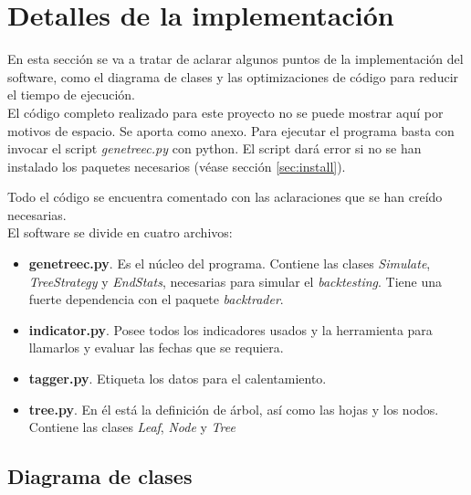 \section{Detalles de la implementaci\'on}

En esta secci\'on se va a tratar de aclarar algunos puntos de la implementaci\'on del software, como el diagrama de clases y las optimizaciones de c\'odigo para reducir el tiempo de ejecuci\'on.\\

El c\'odigo completo realizado para este proyecto no se puede mostrar aqu\'i por motivos de espacio. Se aporta como anexo. Para ejecutar el programa basta con invocar el script \textit{genetreec.py} con python. El script dar\'a error si no se han instalado los paquetes necesarios (véase secci\'on \ref{sec:install}).

Todo el c\'odigo se encuentra comentado con las aclaraciones que se han cre\'ido necesarias.\\


El software se divide en cuatro archivos:

\begin{itemize}
    \item \textbf{genetreec.py}. Es el n\'ucleo del programa. Contiene las clases \textit{Simulate}, \textit{TreeStrategy} y \textit{EndStats}, necesarias para simular el \textit{backtesting}. Tiene una fuerte dependencia con el paquete \textit{backtrader}.
    
    \item \textbf{indicator.py}. Posee todos los indicadores usados y la herramienta para llamarlos y evaluar las fechas que se requiera.
    
    \item \textbf{tagger.py}. Etiqueta los datos para el calentamiento. 
    
    \item \textbf{tree.py}. En \'el est\'a la definici\'on de \'arbol, as\'i como las hojas y los nodos. Contiene las clases \textit{Leaf}, \textit{Node} y \textit{Tree}
\end{itemize}

\subsection{Diagrama de clases}

